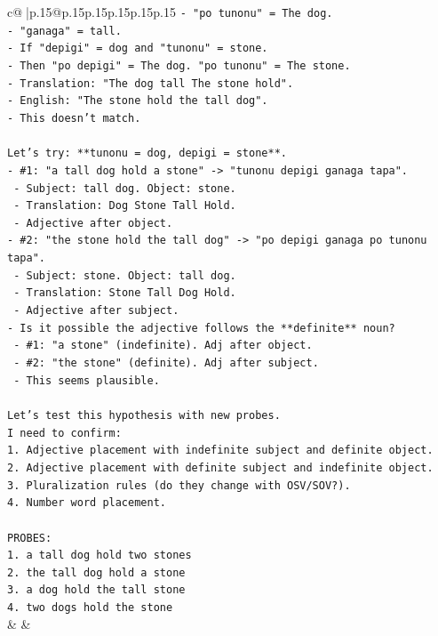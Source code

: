 \documentclass{article}
\begin{document}
{\begin{supertabular}{c@{$\;$}|p{.15\linewidth}@{}p{.15\linewidth}p{.15\linewidth}p{.15\linewidth}p{.15\linewidth}p{.15\linewidth}}
{{{\texttt{{-} "po tunonu" = The dog.} \\
\texttt{{-} "ganaga" = tall.} \\
\texttt{{-} If "depigi" = dog and "tunonu" = stone.} \\
\texttt{{-} Then "po depigi" = The dog. "po tunonu" = The stone.} \\
\texttt{{-} Translation: "The dog tall The stone hold".} \\
\texttt{{-} English: "The stone hold the tall dog".} \\
\texttt{{-} This doesn't match.} \\
\\ 
\texttt{Let's try: **tunonu = dog, depigi = stone**.} \\
\texttt{{-} \#1: "a tall dog hold a stone" {-}> "tunonu depigi ganaga tapa".} \\
\texttt{  {-} Subject: tall dog. Object: stone.} \\
\texttt{  {-} Translation: Dog Stone Tall Hold.} \\
\texttt{  {-} Adjective after object.} \\
\texttt{{-} \#2: "the stone hold the tall dog" {-}> "po depigi ganaga po tunonu tapa".} \\
\texttt{  {-} Subject: stone. Object: tall dog.} \\
\texttt{  {-} Translation: Stone Tall Dog Hold.} \\
\texttt{  {-} Adjective after subject.} \\
\texttt{{-} Is it possible the adjective follows the **definite** noun?} \\
\texttt{  {-} \#1: "a stone" (indefinite). Adj after object.} \\
\texttt{  {-} \#2: "the stone" (definite). Adj after subject.} \\
\texttt{  {-} This seems plausible.} \\
\\ 
\texttt{Let's test this hypothesis with new probes.} \\
\texttt{I need to confirm:} \\
\texttt{1. Adjective placement with indefinite subject and definite object.} \\
\texttt{2. Adjective placement with definite subject and indefinite object.} \\
\texttt{3. Pluralization rules (do they change with OSV/SOV?).} \\
\texttt{4. Number word placement.} \\
\\ 
\texttt{PROBES:} \\
\texttt{1. a tall dog hold two stones} \\
\texttt{2. the tall dog hold a stone} \\
\texttt{3. a dog hold the tall stone} \\
\texttt{4. two dogs hold the stone} \\
            }
        }
    }
    & & \\ \\


\end{supertabular}}
\end{document}
